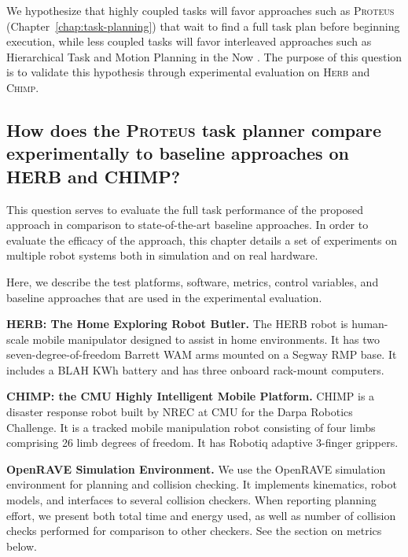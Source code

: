 {We hypothesize that highly coupled tasks will favor approaches
such as \textsc{Proteus} (Chapter~\ref{chap:task-planning})
that wait to find a full task plan
before beginning execution,
while less coupled tasks will favor interleaved approaches
such as Hierarchical Task and Motion Planning in the Now
\cite{kaelbling2011inthenow}.
The purpose of this question is to validate this hypothesis
through experimental evaluation on \textsc{Herb} and \textsc{Chimp}.

\subsection{How does the \textsc{Proteus} task planner
   compare experimentally to baseline approaches
   on \textsc{HERB} and \textsc{CHIMP}?}
\label{ques:proteus-compare}

This question serves to evaluate the full task performance of the
proposed approach
in comparison to state-of-the-art baseline approaches.
In order to evaluate the efficacy of the approach,
this chapter details a set of experiments on multiple robot systems
both in simulation and on real hardware.

Here, we describe the test platforms, software,
metrics, control variables,
and baseline approaches that are used in the experimental
evaluation.

\textbf{HERB: The Home Exploring Robot Butler.}
The HERB robot \citep{srinivasa2012herb20}
is human-scale mobile manipulator designed to assist in home
environments.
It has two seven-degree-of-freedom Barrett WAM arms mounted
on a Segway RMP base.
It includes a BLAH KWh battery and has three onboard rack-mount
computers.

\textbf{CHIMP: the CMU Highly Intelligent Mobile Platform.}
CHIMP \citep{stentz2014chimp}
is a disaster response robot built by NREC at CMU
for the Darpa Robotics Challenge.
It is a tracked mobile manipulation robot consisting of
four limbs comprising 26 limb degrees of freedom.
It has Robotiq adaptive 3-finger grippers.

\textbf{OpenRAVE Simulation Environment.}
We use the OpenRAVE \citep{diankov2010openrave} simulation environment
for planning and collision checking.
It implements kinematics, robot models,
and interfaces to several collision checkers.
When reporting planning effort,
we present both total time and energy used,
as well as number of collision checks performed
for comparison to other checkers.
See the section on metrics below.

}
